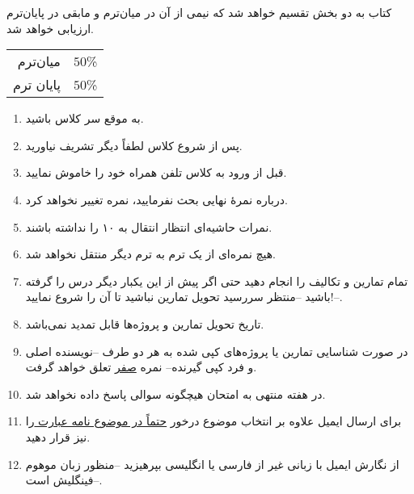 \documentclass[10pt,a5paper,computeautoilg,pdfinfo=on]{unistyle}
\begin{document}
کتاب به دو بخش تقسیم خواهد شد که نیمی از آن در میان‌ترم و مابقی در پایان‌ترم ارزیابی خواهد شد.
\begin{RTLcases}\begin{tabular}{rl}
میان‌ترم & $50$\%   \\ 
پایان ترم & $50$\%
\end{tabular}\end{RTLcases}

\begin{multicols}{2}
\begin{enumerate}
\item به موقع سر کلاس باشید.
\item پس از شروع کلاس لطفاً دیگر تشریف نیاورید.
\item قبل از ورود به کلاس تلفن همراه خود را خاموش نمایید.
\item درباره نمرهٔ نهایی بحث نفرمایید، نمره تغییر نخواهد کرد.
\item نمرات حاشیه‌ای انتظار انتقال به ۱۰ را نداشته باشند.
\item هیچ نمره‌ای از یک ترم به ترم دیگر منتقل نخواهد شد.
\item تمام تمارین و تکالیف را انجام دهید حتی اگر پیش از این یکبار دیگر درس را گرفته‌ باشید --منتظر سررسید تحویل تمارین نباشید تا آن را شروع نمایید!--.
\item تاریخ تحویل تمارین و پروژه‌ها قابل تمدید نمی‌باشد.
\item در صورت شناسایی تمارین یا پروژه‌های کپی شده به هر دو طرف --نویسنده اصلی و فرد کپی گیرنده-- نمره \underline{صفر}   تعلق خواهد گرفت.
\item در هفته منتهی به امتحان هیچگونه سوالی پاسخ داده نخواهد شد.
\item
 برای ارسال ایمیل علاوه بر انتخاب موضوع درخور \underline{ حتماً در موضوع نامه عبارت \lr{[FLS2019]}} را نیز قرار دهید.
\item از نگارش ایمیل با زبانی غیر از فارسی یا انگلیسی بپرهیزید --منظور زبان موهوم فینگلیش است--.
\end{enumerate}
\end{multicols}


\vfill\kalamehakim
\xepersianproof
\end{document}
